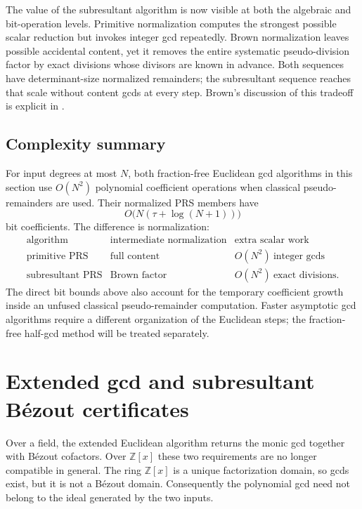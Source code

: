 \documentclass[11pt]{book}
\theoremstyle{definition}
\newcommand{\ZZ}{\mathbb Z}
\begin{document}
The value of the subresultant algorithm is now visible at both the algebraic
and bit-operation levels.  Primitive normalization computes the strongest
possible scalar reduction but invokes integer gcd repeatedly.  Brown
normalization leaves possible accidental content, yet it removes the entire
systematic pseudo-division factor by exact divisions whose divisors are known in
advance.  Both sequences have determinant-size normalized remainders; the
subresultant sequence reaches that scale without content gcds at every step.
Brown's discussion of this tradeoff is explicit in \cite{Brown1978}.

\subsection{Complexity summary}

For input degrees at most $N$, both fraction-free Euclidean gcd algorithms in
this section use $O(N^2)$ polynomial coefficient operations when classical
pseudo-remainders are used.  Their normalized PRS members have
\[
 O\bigl(N(\tau+\log(N+1))\bigr)
\]
bit coefficients.  The difference is normalization:
\[
\begin{array}{c|c|c}
 \text{algorithm} & \text{intermediate normalization} & \text{extra scalar work}\\
 \hline
 \text{primitive PRS} & \text{full content} & O(N^2)\ \text{integer gcds}\\
 \text{subresultant PRS} & \text{Brown factor} & O(N^2)\ \text{exact divisions}.
\end{array}
\]
The direct bit bounds above also account for the temporary coefficient growth
inside an unfused classical pseudo-remainder computation.  Faster asymptotic
gcd algorithms require a different organization of the Euclidean steps; the
fraction-free half-gcd method will be treated separately.




\section{Extended gcd and subresultant B\'ezout certificates}
\label{sec:zz-poly-xgcd}

Over a field, the extended Euclidean algorithm returns the monic gcd together
with B\'ezout cofactors.  Over $\ZZ[x]$ these two requirements are no longer
compatible in general.  The ring $\ZZ[x]$ is a unique factorization domain,
so gcds exist, but it is not a B\'ezout domain.  Consequently the polynomial
gcd need not belong to the ideal generated by the two inputs.
\end{document}

